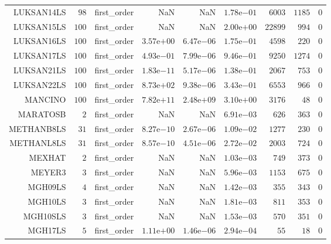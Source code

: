 \begin{longtable}{rrrrrrrrr}
LUKSAN14LS & \(    98\) & first\_order &       NaN &       NaN & \( 1.78\)e\(-01\) & \(  6003\) & \(  1185\) & \(     0\) \\
LUKSAN15LS & \(   100\) & first\_order &       NaN &       NaN & \( 2.00\)e\(+00\) & \( 22899\) & \(   994\) & \(     0\) \\
LUKSAN16LS & \(   100\) & first\_order & \( 3.57\)e\(+00\) & \( 6.47\)e\(-06\) & \( 1.75\)e\(-01\) & \(  4598\) & \(   220\) & \(     0\) \\
LUKSAN17LS & \(   100\) & first\_order & \( 4.93\)e\(-01\) & \( 7.99\)e\(-06\) & \( 9.46\)e\(-01\) & \(  9250\) & \(  1274\) & \(     0\) \\
LUKSAN21LS & \(   100\) & first\_order & \( 1.83\)e\(-11\) & \( 5.17\)e\(-06\) & \( 1.38\)e\(-01\) & \(  2067\) & \(   753\) & \(     0\) \\
LUKSAN22LS & \(   100\) & first\_order & \( 8.73\)e\(+02\) & \( 9.38\)e\(-06\) & \( 3.43\)e\(-01\) & \(  6553\) & \(   966\) & \(     0\) \\
MANCINO & \(   100\) & first\_order & \( 7.82\)e\(+11\) & \( 2.48\)e\(+09\) & \( 3.10\)e\(+00\) & \(  3176\) & \(    48\) & \(     0\) \\
MARATOSB & \(     2\) & first\_order &       NaN &       NaN & \( 6.91\)e\(-03\) & \(   626\) & \(   363\) & \(     0\) \\
METHANB8LS & \(    31\) & first\_order & \( 8.27\)e\(-10\) & \( 2.67\)e\(-06\) & \( 1.09\)e\(-02\) & \(  1277\) & \(   230\) & \(     0\) \\
METHANL8LS & \(    31\) & first\_order & \( 8.57\)e\(-10\) & \( 4.51\)e\(-06\) & \( 2.72\)e\(-02\) & \(  2003\) & \(   724\) & \(     0\) \\
MEXHAT & \(     2\) & first\_order &       NaN &       NaN & \( 1.03\)e\(-03\) & \(   749\) & \(   373\) & \(     0\) \\
MEYER3 & \(     3\) & first\_order &       NaN &       NaN & \( 5.96\)e\(-03\) & \(  1153\) & \(   675\) & \(     0\) \\
MGH09LS & \(     4\) & first\_order &       NaN &       NaN & \( 1.42\)e\(-03\) & \(   355\) & \(   343\) & \(     0\) \\
MGH10LS & \(     3\) & first\_order &       NaN &       NaN & \( 1.81\)e\(-03\) & \(   811\) & \(   353\) & \(     0\) \\
MGH10SLS & \(     3\) & first\_order &       NaN &       NaN & \( 1.53\)e\(-03\) & \(   570\) & \(   351\) & \(     0\) \\
MGH17LS & \(     5\) & first\_order & \( 1.11\)e\(+00\) & \( 1.46\)e\(-06\) & \( 2.94\)e\(-04\) & \(    55\) & \(    18\) & \(     0\) \\

\end{longtable}
